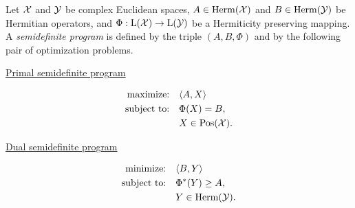 Let $\mathcal{X}$ and $\mathcal{Y}$ be complex Euclidean spaces, $A\in\mathrm{Herm}(\mathcal{X})$ and $B\in\mathrm{Herm}(\mathcal{Y})$
be Hermitian operators, and $\Phi:\mathrm{L}(\mathcal{X})\to\mathrm{L}(\mathcal{Y})$ be a Hermiticity preserving mapping.
A \emph{semidefinite program} is defined by the triple $(A,B,\Phi)$ and by 
the following pair of optimization problems.
\begin{center}
  \begin{minipage}{2in}
    \centerline{\underline{Primal semidefinite program}}\vspace{-7mm}
    \begin{align*}
      \text{maximize:}\quad & \langle A , X\rangle\\
      \text{subject to:}\quad & \Phi(X) = B,\\
      & X \in \mathrm{Pos}(\mathcal{X}).
    \end{align*}
  \end{minipage}
  \hspace*{1.5cm}
  \begin{minipage}{2.4in}
    \centerline{\underline{Dual semidefinite program}}\vspace{-7mm}
    \begin{align*}
      \text{minimize:}\quad & \langle B , Y\rangle\\
      \text{subject to:}\quad & \Phi^{\ast}(Y) \geq A,\\
      & Y\in\mathrm{Herm}(\mathcal{Y}).
    \end{align*}
  \end{minipage}
\end{center}


